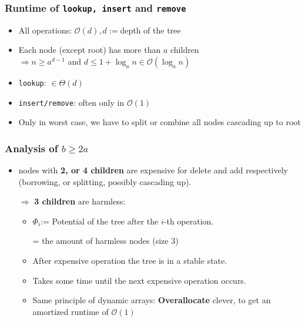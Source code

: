 \documentclass[12pt, a4paper]{scrartcl}
\newcommand{\bigO}{\mathcal{O}}
\renewcommand{\implies}{\Rightarrow}
\begin{document}
\subsubsection*{Runtime of \texttt{lookup, insert} and \texttt{remove}}
\begin{itemize}
\item All operations: $\bigO(d), d:=$depth of the tree
\item Each node (except root) has more than $a$ children\\
  $\implies n\ge a^{d-1}$ and $d\le 1+\log_a n \in \bigO(\log_a n)$
\item \texttt{lookup}: $\in\Theta(d)$
\item \texttt{insert/remove}: often only in $\bigO(1)$
\item Only in worst case, we have to split or combine all nodes cascading up to root
\end{itemize}

\subsubsection{Analysis of $b\ge2a$}
\begin{itemize}
\item nodes with \textbf{2, or 4 children} are expensive for delete and add respectively (borrowing, or splitting, possibly cascading up).
\item[$\implies$] \textbf{3 children} are harmless:
  \begin{itemize}
  \item $\Phi_i$:= Potential of the tree after the $i$-th operation.
  \item[=] the amount of harmless nodes (size 3)
  \item After expensive operation the tree is in a stable state. %
  \item Takes some time until the next expensive operation occurs.
  \item Same principle of dynamic arrays: \textbf{Overallocate} clever, to get an amortized runtime of $\bigO(1)$
  \end{itemize}
\end{itemize}
\end{document}
